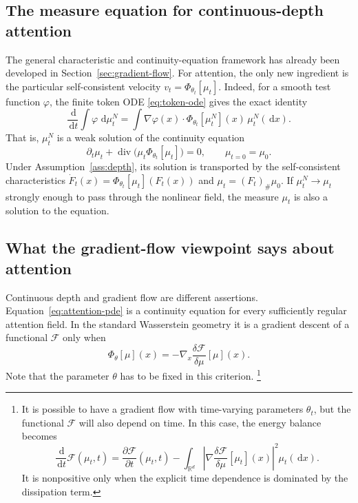 \documentclass[11pt]{amsart}
\numberwithin{equation}{section}
\theoremstyle{plain}
\newcommand{\R}{\mathbb{R}}
\newcommand{\dd}{\,\mathrm{d}}
\DeclareMathOperator{\diver}{div}
\begin{document}
\subsection{The measure equation for continuous-depth attention}

The general characteristic and continuity-equation framework has
already been developed in Section~\ref{sec:gradient-flow}.  For attention, the
only new ingredient is the particular self-consistent velocity
$v_t=\Phi_{\theta_t}[\mu_t]$.  Indeed, for a smooth test function $\varphi$,
the finite token ODE \eqref{eq:token-ode} gives the exact identity
\begin{equation}\label{eq:token-weak}
    \frac{\dd}{\dd t}\int\varphi\,\dd\mu_t^N
    =\int\nabla\varphi(x)\cdot
       \Phi_{\theta_t}[\mu_t^N](x)\,\mu_t^N(\dd x).
 \end{equation}
That is, $\mu_t^N$ is a weak solution of the continuity equation
\begin{equation}\label{eq:attention-pde}
    \partial_t\mu_t+
    \diver\bigl(\mu_t\Phi_{\theta_t}[\mu_t]\bigr)=0,
    \qquad \mu_{t=0}=\mu_0.
\end{equation}
Under Assumption~\ref{ass:depth}, its solution is transported by the
self-consistent characteristics
$\dot F_t(x)=\Phi_{\theta_t}[\mu_t](F_t(x))$ and
$\mu_t=(F_t)_\#\mu_0$. If $\mu_t^N\to\mu_t$ strongly enough to pass through the nonlinear field, the measure $\mu_t$ is also a solution to the equation.


\subsection{What the gradient-flow viewpoint says about attention}
\label{sec:attention-gradient-flow}

Continuous depth and gradient flow are different assertions.
Equation~\eqref{eq:attention-pde} is a continuity equation for every
sufficiently regular attention field. In the standard Wasserstein geometry it
is a gradient descent of a functional $\mathcal F$ only when
\begin{equation}\label{eq:attention-variational-criterion}
 \Phi_\theta[\mu](x)
 =-\nabla_x\frac{\delta\mathcal F}{\delta\mu}[\mu](x).
\end{equation}
Note that the parameter $\theta$ has to be fixed in this criterion. \footnote{It is possible to have a gradient flow with time-varying parameters $\theta_t$, but the functional $\mathcal F$ will also depend on time.  In this case, the energy balance becomes
\[
\frac{\dd}{\dd t}\mathcal F(\mu_t,t)
 =\frac{\partial \mathcal F}{\partial t}(\mu_t,t)
 -\int_{\R^d}\left|
 \nabla\frac{\delta\mathcal F}{\delta\mu}[\mu_t](x)
 \right|^2\mu_t(\dd x).
\]
It is nonpositive only when the explicit time dependence is dominated by the
dissipation term.
}
\end{document}

